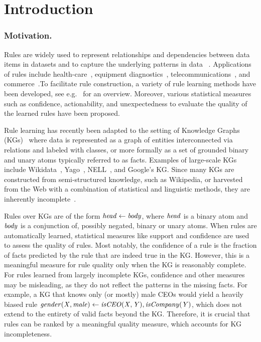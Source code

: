 
\section{Introduction}\label{sec:intro}

\subsubsection{Motivation.}
Rules are widely used to 
represent relationships and dependencies between data items in datasets
and to capture the underlying patterns in data%
~\cite{Agrawal:1993:MAR:170036.170072,DBLP:books/mit/PF91/Piatetsky91}.
Applications of rules 
include health-care~\cite{DBLP:series/isrl/Wojtusiak14}, 
equipment diagnostics~\cite{DBLP:conf/cikm/KharlamovSXPMRH17,DBLP:conf/semweb/MehdiKSXKBHRR17},
telecommunications~\cite{DBLP:conf/kdd/MannilaTV95}, 
and commerce~\cite{DBLP:conf/pkdd/RasW00}.To facilitate rule construction, a variety of
rule learning methods have been developed,
see e.g.~\cite{DBLP:conf/ruleml/FurnkranzK15,association-rule-mining-overview} for an overview.
Moreover, various statistical measures such as confidence,
actionability, and unexpectedness to evaluate the quality of the learned rules have been proposed. 

Rule learning has recently been adapted to the setting of
 Knowledge Graphs (KGs)~\cite{amie,DBLP:journals/corr/WangL15i,gad2016,trantowards}
where data is represented as a graph of entities interconnected via relations and labeled with classes, or more formally as a set of grounded binary and unary atoms typically referred to as facts.
Examples of large-scale KGs include 
Wikidata~\cite{wikidata}, 
Yago~\cite{yago}, 
NELL~\cite{NELL-aaai15},
 and Google's KG. 
Since many KGs are constructed from semi-structured knowledge, such
as Wikipedia, or harvested from the Web with a combination of statistical and linguistic methods, they are inherently incomplete~\cite{amie}. 

Rules over KGs are of the form $\mathit{head \leftarrow body}$,
where $\mathit{head}$ is a binary atom and 
$\mathit{body}$ is a conjunction of, possibly negated, binary or unary atoms.
When rules are automatically learned, statistical measures like
support and confidence are used to assess the quality of rules.
Most notably, the confidence of a rule is the fraction of
facts predicted by the rule that are indeed true in the KG.
However, this is a meaningful measure for rule quality only
when the KG is reasonably complete.
For rules learned from largely incomplete KGs, confidence and
other measures may be misleading, as they do not reflect
the patterns in the missing facts.
For example, a KG that knows only (or mostly) male CEOs
would yield a heavily biased rule 
$\mathit{gender(X,male) \leftarrow isCEO(X,Y), isCompany(Y)}$, 
which does not
extend to the entirety of valid facts beyond the KG.
Therefore, it is crucial that rules can be ranked by a meaningful
quality measure, 
which accounts for 
KG incompleteness. 


